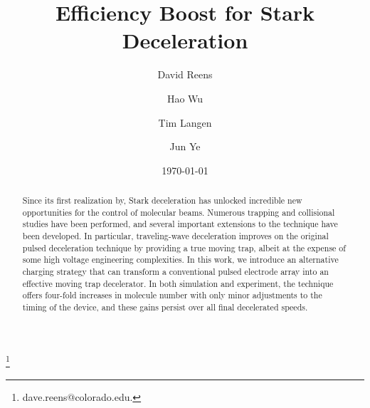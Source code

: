 \documentclass[%
 reprint,
 amsmath,amssymb,
 aps,
pra,
]{revtex4-1}
\begin{document}
\title{Efficiency Boost for Stark Deceleration}%

\author{David Reens}
\thanks{dave.reens@colorado.edu.}

\author{Hao Wu}

\author{Tim Langen}%

\author{Jun Ye}


\date{\today}


\begin{abstract}
Since its first realization by, Stark deceleration has unlocked incredible new opportunities for the control of molecular beams. 
Numerous trapping and collisional studies have been performed, and several important extensions to the technique have been developed. 
In particular, traveling-wave deceleration improves on the original pulsed deceleration technique by providing a true moving trap, albeit at the expense of some high voltage engineering complexities.
In this work, we introduce an alternative charging strategy that can transform a conventional pulsed electrode array into an effective moving trap decelerator.
In both simulation and experiment, the technique offers four-fold increases in molecule number with only minor adjustments to the timing of the device, and these gains persist over all final decelerated speeds.
\end{abstract}


\maketitle


\end{document}

